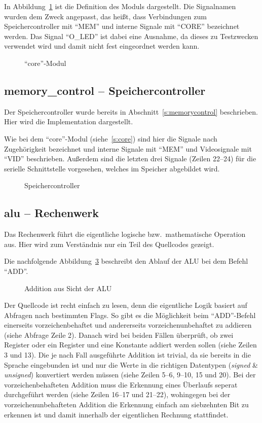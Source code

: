 In Abbildung~\ref{code:core} ist die Definition des Moduls dargestellt. Die
Signalnamen wurden dem Zweck angepasst, das heißt, dass Verbindungen zum
Speichercontroller mit "`MEM"' und interne Signale mit "`CORE"' bezeichnet werden.
Das Signal "`O\_LED"' ist dabei eine Ausnahme, da dieses zu Testzwecken verwendet
wird und damit nicht fest eingeordnet werden kann.
\begin{figure}[htb]

\caption{"`core"'-Modul}
\label{code:core}
\end{figure}
\pagebreak
\subsection{memory\_control -- Speichercontroller}
\label{s:memcontrol}
Der Speichercontroller wurde bereits in Abschnitt~\ref{s:memorycontrol}
beschrieben. Hier wird die Implementation dargestellt.

Wie bei dem "`core"'-Modul (siehe~\ref{s:core}) sind hier die Signale nach
Zugehörigkeit bezeichnet und interne Signale mit "`MEM"' und Videosignale mit
"`VID"' beschrieben. Außerdem sind die letzten drei Signale (Zeilen 22--24) für
die serielle Schnittstelle vorgesehen, welches im Speicher abgebildet wird.
\begin{figure}[htb]

\caption{Speichercontroller}
\label{code:mem_control}
\end{figure}
\pagebreak
\subsection{alu -- Rechenwerk}
Das Rechenwerk führt die eigentliche logische bzw.\ mathematische Operation aus.
Hier wird zum Verständnis nur ein Teil des Quellcodes gezeigt.

Die nachfolgende Abbildung~\ref{code:alu_add} beschreibt den Ablauf der \ac{ALU} bei dem Befehl
"`ADD"'.

\begin{figure}[htb]

\caption{Addition aus Sicht der ALU}
\label{code:alu_add}
\end{figure}
Der Quellcode ist recht einfach zu lesen, denn die eigentliche Logik basiert auf
Abfragen nach bestimmten Flags. So gibt es die Möglichkeit beim "`ADD"'-Befehl
einerseits vorzeichenbehaftet und andererseits vorzeichenunbehaftet zu addieren
(siehe Abfrage Zeile 2). Danach wird bei beiden Fällen überprüft, ob zwei
Register oder ein Register und eine Konstante addiert werden sollen (siehe
Zeilen 3 und 13). Die je nach Fall ausgeführte Addition ist trivial, da sie
bereits in die Sprache eingebunden ist und nur die Werte in die richtigen
Datentypen (\textit{signed} \& \textit{unsigned}) konvertiert werden müssen
(siehe Zeilen 5--6, 9--10, 15 und 20).  Bei der vorzeichenbehafteten Addition
muss die Erkennung eines Überlaufs seperat durchgeführt werden (siehe Zeilen
16--17 und 21--22), wohingegen bei der vorzeichenunbehafteten Addition die
Erkennung einfach am siebzehnten Bit zu erkennen ist und damit innerhalb der
eigentlichen Rechnung stattfindet.
